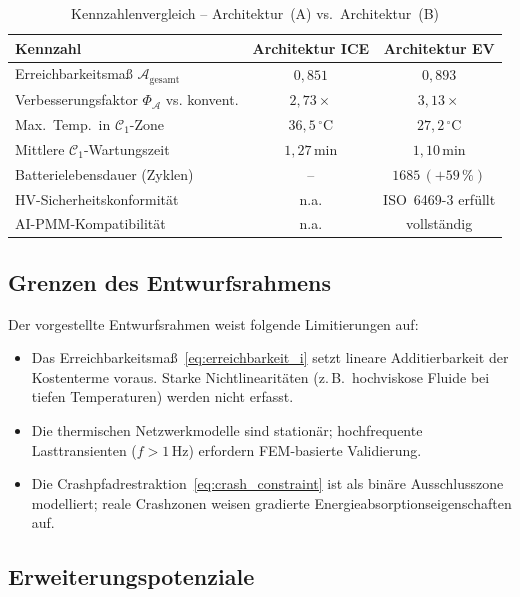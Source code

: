 ﻿\documentclass[12pt,a4paper]{article}
\begin{document}
\begin{table}[H]
	\centering
	\caption{Kennzahlenvergleich -- Architektur~(A) vs.\ Architektur~(B)}
	\label{tab:architektur_vergleich}
	\begin{tabular}{lcc}
		\toprule
		\textbf{Kennzahl} & \textbf{Architektur ICE} & \textbf{Architektur EV} \\
		\midrule
		Erreichbarkeitsmaß $\mathcal{A}_\mathrm{gesamt}$ & $0{,}851$ & $0{,}893$ \\
		Verbesserungsfaktor $\Phi_\mathcal{A}$ vs. konvent. & $2{,}73\times$ & $3{,}13\times$ \\
		Max.\ Temp.\ in $\mathcal{C}_1$-Zone & $36{,}5\,^\circ$C & $27{,}2\,^\circ$C \\
		Mittlere $\mathcal{C}_1$-Wartungszeit & $1{,}27\,\mathrm{min}$ & $1{,}10\,\mathrm{min}$ \\
		Batterielebensdauer (Zyklen) & -- & $1685\,(+59\,\%)$ \\
		HV-Sicherheitskonformität & n.a. & ISO~6469-3 erfüllt \\
		AI-PMM-Kompatibilität & n.a. & vollständig \\
		\bottomrule
	\end{tabular}
\end{table}

\subsection{Grenzen des Entwurfsrahmens}

Der vorgestellte Entwurfsrahmen weist folgende Limitierungen auf:

\begin{itemize}[leftmargin=*]
	\item Das Erreichbarkeitsmaß~\eqref{eq:erreichbarkeit_i} setzt lineare
	Additierbarkeit der Kostenterme voraus. Starke Nichtlinearitäten (z.\,B.\
	hochviskose Fluide bei tiefen Temperaturen) werden nicht erfasst.
	\item Die thermischen Netzwerkmodelle sind stationär; hochfrequente
	Lasttransienten ($f > 1\,\mathrm{Hz}$) erfordern FEM-basierte Validierung.
	\item Die Crashpfadrestraktion~\eqref{eq:crash_constraint} ist als
	binäre Ausschlusszone modelliert; reale Crashzonen weisen gradierte
	Energieabsorptionseigenschaften auf.
\end{itemize}

\subsection{Erweiterungspotenziale}
\end{document}
